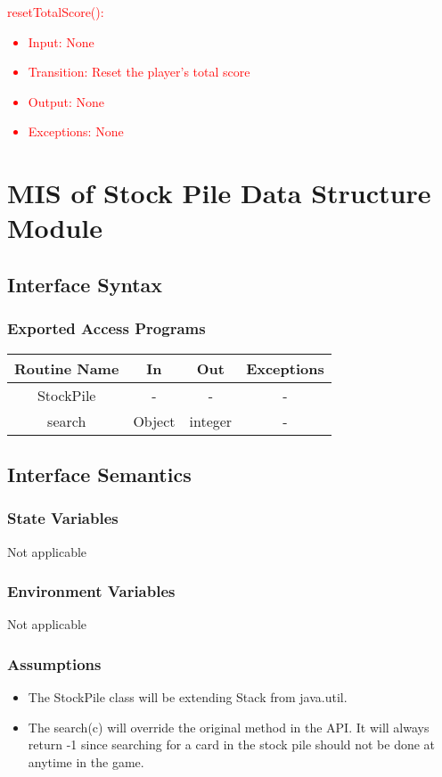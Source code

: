 \documentclass[12pt, titlepage]{article}
\begin{document}
\noindent \textcolor{red}{resetTotalScore():
\begin{itemize}
    \item Input: None
    \item Transition: Reset the player's total score
    \item Output: None
    \item Exceptions: None
\end{itemize}
}

\section{MIS of Stock Pile Data Structure Module}
\subsection{Interface Syntax}
\subsubsection{Exported Access Programs}

\begin{tabular}[pos]{| c | c | c | c |}
    \hline
    \textbf{Routine Name} & \textbf{In} & \textbf{Out} & \textbf{Exceptions}\\
    \hline
    StockPile & - & - & - \\
    \hline
    search & Object & integer & - \\
    \hline
\end{tabular}

\subsection{Interface Semantics}
\subsubsection{State Variables}
Not applicable

\subsubsection{Environment Variables}
Not applicable

\subsubsection{Assumptions}
\begin{itemize}
    \item The StockPile class will be extending Stack from java.util.
    \item The search(c) will override the original method in the API. It will always return -1 since searching for a card in the stock pile should not be done at anytime in the game.
\end{itemize}
\end{document}
